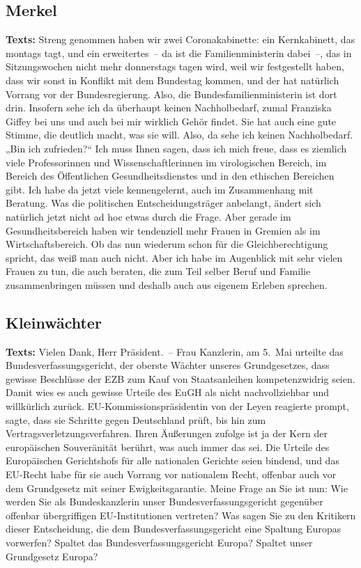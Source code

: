 \documentclass{article}
\begin{document}
\subsection{Merkel}
\noindent\textbf{Texts:} Streng genommen haben wir zwei Coronakabinette: ein Kernkabinett, das montags tagt, und ein erweitertes – da ist die Familienministerin dabei –, das in Sitzungswochen nicht mehr donnerstags tagen wird, weil wir festgestellt haben, dass wir sonst in Konflikt mit dem Bundestag kommen, und der hat natürlich Vorrang vor der Bundesregierung. Also, die Bundesfamilienministerin ist dort drin. Insofern sehe ich da überhaupt keinen Nachholbedarf, zumal Franziska Giffey bei uns und auch bei mir wirklich Gehör findet. Sie hat auch eine gute Stimme, die deutlich macht, was sie will. Also, da sehe ich keinen Nachholbedarf. „Bin ich zufrieden?“ Ich muss Ihnen sagen, dass ich mich freue, dass es ziemlich viele Professorinnen und Wissenschaftlerinnen im virologischen Bereich, im Bereich des Öffentlichen Gesundheitsdienstes und in den ethischen Bereichen gibt. Ich habe da jetzt viele kennengelernt, auch im Zusammenhang mit Beratung. Was die politischen Entscheidungsträger anbelangt, ändert sich natürlich jetzt nicht ad hoc etwas durch die Frage. Aber gerade im Gesundheitsbereich haben wir tendenziell mehr Frauen in Gremien als im Wirtschaftsbereich. Ob das nun wiederum schon für die Gleichberechtigung spricht, das weiß man auch nicht. Aber ich habe im Augenblick mit sehr vielen Frauen zu tun, die auch beraten, die zum Teil selber Beruf und Familie zusammenbringen müssen und deshalb auch aus eigenem Erleben sprechen.

\subsection{Kleinwächter}
\noindent\textbf{Texts:} Vielen Dank, Herr Präsident. – Frau Kanzlerin, am 5. Mai urteilte das Bundesverfassungsgericht, der oberste Wächter unseres Grundgesetzes, dass gewisse Beschlüsse der EZB zum Kauf von Staatsanleihen kompetenzwidrig seien. Damit wies es auch gewisse Urteile des EuGH als nicht nachvollziehbar und willkürlich zurück. EU-Kommissionspräsidentin von der Leyen reagierte prompt, sagte, dass sie Schritte gegen Deutschland prüft, bis hin zum Vertragsverletzungsverfahren. Ihren Äußerungen zufolge ist ja der Kern der europäischen Souveränität berührt, was auch immer das sei. Die Urteile des Europäischen Gerichtshofs für alle nationalen Gerichte seien bindend, und das EU-Recht habe für sie auch Vorrang vor nationalem Recht, offenbar auch vor dem Grundgesetz mit seiner Ewigkeitsgarantie. Meine Frage an Sie ist nun: Wie werden Sie als Bundeskanzlerin unser Bundesverfassungsgericht gegenüber offenbar übergriffigen EU-Institutionen vertreten? Was sagen Sie zu den Kritikern dieser Entscheidung, die dem Bundesverfassungsgericht eine Spaltung Europas vorwerfen? Spaltet das Bundesverfassungsgericht Europa? Spaltet unser Grundgesetz Europa?
\end{document}
